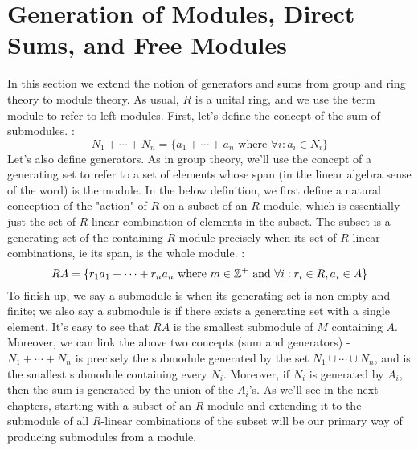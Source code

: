 \documentclass{article}
\begin{document}
\section{Generation of Modules, Direct Sums, and Free Modules}
In this section we extend the notion of generators and sums from group and ring theory to module theory. As usual, $ R $ is a unital ring, and we use the term module to refer to left modules. First, let's define the concept of the sum of submodules.
\nn
{}: 
$$ N_1 + \cdots + N_n = \{ a_1 + \cdots + a_n \text{ where } \forall i: a_i \in N_i \} $$
Let's also define generators. As in group theory, we'll use the concept of a generating set to refer to a set of elements whose span (in the linear algebra sense of the word) is the module. In the below definition, we first define a natural conception of the "action" of $ R $ on a subset of an $ R $-module, which is essentially just the set of $ R $-linear combination of elements in the subset. The subset is a generating set of the containing $ R $-module precisely when its set of $ R $-linear combinations, ie its span, is the whole module.
\nn
{}: 
$$ R A = \{ r_1 a_1 + \cdots + r_n a_n \text{ where } m \in \mathbb{Z}^+ \text{ and } \forall i: r_i \in R, a_i \in A \} $$
\indent {}
\nn
To finish up, we say a submodule is  when its generating set is non-empty and finite; we also say a submodule is  if there exists a generating set with a single element. It's easy to see that $ R A $ is the smallest submodule of $ M $ containing $ A $. Moreover, we can link the above two concepts (sum and generators) - $ N_1 + \cdots + N_n $ is precisely the submodule generated by the set $ N_1 \cup \cdots \cup N_n $, and is the smallest submodule containing every $ N_i $. Moreover, if $ N_i $ is generated by $ A_i $, then the sum is generated by the union of the $ A_i $'s. As we'll see in the next chapters, starting with a subset of an $ R $-module and extending it to the submodule of all $ R $-linear combinations of the subset will be our primary way of producing submodules from a module.
\n
\end{document}
